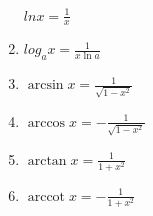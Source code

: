 \begin{center}
\begin{small}
\begin{enumerate}
\begin{math}
                ln x = \frac{1}{x}
            \end{math}
            \item \begin{math}
                log_a x = \frac{1}{x \ln a}
            \end{math}
            \item \begin{math}
                \arcsin x = \frac{1}{\sqrt {1 - x^2}}
            \end{math}
            \item \begin{math}
                \arccos x = - \frac{1}{\sqrt{1 - x^2}}
            \end{math}
            \item \begin{math}
                \arctan x = \frac{1}{1 + x^2}
            \end{math}
            \item \begin{math}
                \operatorname{arccot}x = -\frac{1}{1 + x^2}
            \end{math}
        \end{enumerate}
    \end{small}
\end{center}

